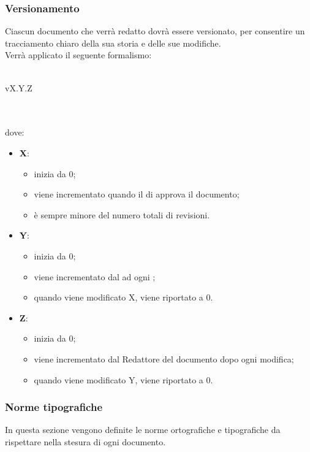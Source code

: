 \subsubsection{Versionamento}
Ciascun documento che verrà redatto dovrà essere versionato, per consentire un tracciamento chiaro della sua storia e delle sue modifiche.\\Verrà applicato il seguente formalismo:\\ \\ \centerline{vX.Y.Z}\\ \\dove:
\begin{itemize}
	\item \textbf{X}:
	\begin{itemize}
		\item inizia da 0;
		\item viene incrementato quando il \RESP{} di  approva il documento;
		\item è sempre minore del numero totali di revisioni.
	\end{itemize}
	\item \textbf{Y}:
	\begin{itemize}
		\item inizia da 0;
		\item viene incrementato dal \VER{} ad ogni ;
		\item quando viene modificato X, viene riportato a 0.
	\end{itemize}
	\item \textbf{Z}:
	\begin{itemize}
		\item inizia da 0;
		\item viene incrementato dal Redattore del documento dopo ogni modifica;
		\item quando viene modificato Y, viene riportato a 0.
	\end{itemize}
\end{itemize}
\subsubsection{Norme tipografiche}
In questa sezione vengono definite le norme ortografiche e tipografiche da rispettare nella stesura di ogni documento.
